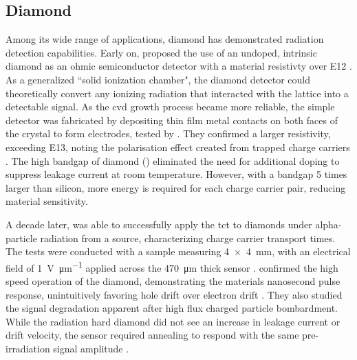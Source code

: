 \documentclass[../../../main.tex]{subfiles}
\begin{document}
%
    \subsection{Diamond}%
    \label{sec:chapter-2:semiconductor-detectors:diamond}%
    Among its wide range of applications, diamond has demonstrated radiation detection capabilities.
    Early on, \citeauthor*{Kania_1993} proposed the use of an undoped, intrinsic diamond as an ohmic semiconductor detector with a material resistivty over \SI{E12}{\ohmcm} \cite{Kania_1993}.
    As a generalized ``solid ionization chamber", the diamond detector could theoretically convert any ionizing radiation that interacted with the lattice into a detectable signal.
    As the \gls{cvd} growth process became more reliable, the simple detector was fabricated by depositing thin film metal contacts on both faces of the crystal to form electrodes, tested by \citeauthor*{Behnke_1998}.
    They confirmed a larger resistivity, exceeding \SI{E13}{\ohmcm}, noting the polarisation effect created from trapped charge carriers \cite{Behnke_1998}.
    The high bandgap of diamond () eliminated the need for additional doping to suppress leakage current at room temperature.
    However, with a bandgap \num{5} times larger than silicon, more energy is required for each charge carrier pair, reducing material sensitivity.
    \par%
    A decade later, \citeauthor*{Pernegger_2005} was able to successfully apply the \gls{tct} to diamonds under \gls{alpha-particle} radiation  from a  source, characterizing charge carrier transport times.
    The tests were conducted with a sample measuring \SI[product-units=power]{4 x 4}{\milli\meter}, with an electrical field of \SI[per-mode=symbol]{1}{\volt\per\micro\meter} applied across the \SI{470}{\micro\meter} thick sensor \cite{Pernegger_2005}.
    \citeauthor*{Pomorski_2006} confirmed the high speed operation of the diamond, demonstrating the materials nanosecond pulse response, unintuitively favoring hole drift over electron drift \cite{Pomorski_2006}.
    They also studied the signal degradation apparent after high flux charged particle bombardment.
    While the radiation hard diamond did not see an increase in leakage current or drift velocity, the sensor required annealing to respond with the same pre-irradiation signal amplitude \cite{Pomorski_2007}.
\end{document}
